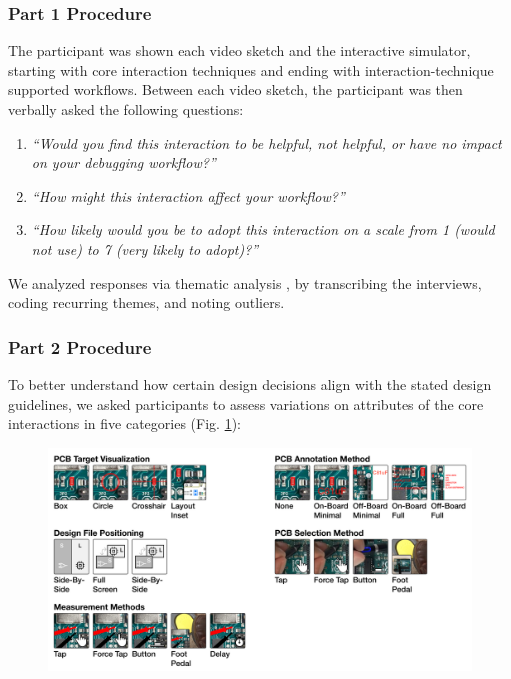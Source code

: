 \documentclass [11pt, proquest] {uwthesis}[2020/02/24]
\begin{document}
\subsubsection{Part 1 Procedure}
The participant was shown each video sketch and the interactive simulator, starting with core interaction techniques and ending with interaction-technique supported workflows. Between each video sketch, the participant was then verbally asked the following questions:
\begin{enumerate}
    \item \textit{``Would you find this interaction to be helpful, not helpful, or have no impact on your debugging workflow?''}
    \item \textit{``How might this interaction affect your workflow?''}
    \item \textit{``How likely would you be to adopt this interaction on a scale from 1 (would not use) to 7 (very likely to adopt)?''}
\end{enumerate}
We analyzed responses via thematic analysis \cite{Braun2006UsingPsychology}, by transcribing the interviews, coding recurring themes, and noting outliers.

\subsubsection{Part 2 Procedure}
To better understand how certain design decisions align with the stated design guidelines, we asked participants to assess variations on attributes of the core interactions in five categories
(Fig.
\ref{fig:Procedure-Part2}):

\begin{figure}
\centering
    \centering
    \includegraphics[width=0.7\linewidth]{AS_figures/Procedure-Part2/Attributes.jpg}
\label{fig:Procedure-Part2}
\end{figure}
\end{document}
